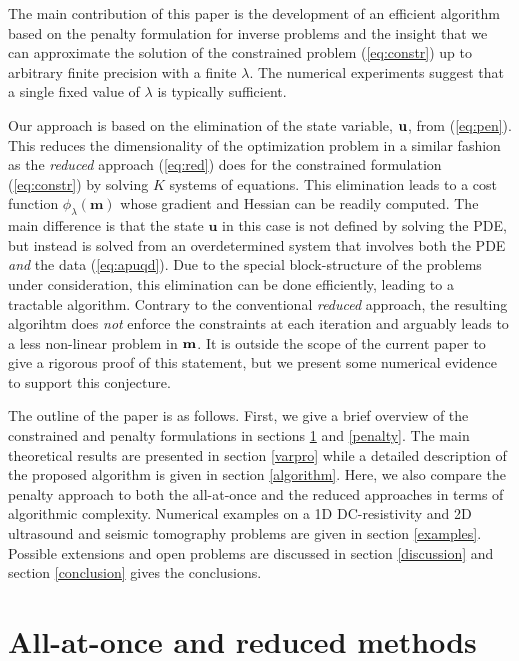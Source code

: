 \documentclass{iopart}
\begin{document}
The main contribution of this paper is the development of an efficient algorithm based on the penalty formulation for inverse problems and the insight that we can approximate the solution of the constrained problem (\ref{eq:constr}) up to arbitrary finite precision with a finite $\lambda$. The numerical experiments suggest that a single fixed value of $\lambda$ is typically sufficient.

Our approach is based on the elimination of the state variable, $\mathbf{u}$, from (\ref{eq:pen}). This reduces the dimensionality of the optimization problem in a similar fashion as the \emph{reduced} approach (\ref{eq:red}) does for the constrained formulation (\ref{eq:constr}) by solving $K$ systems of equations. This elimination leads to a cost function $\phi_{\lambda}(\mathbf{m})$ whose gradient and Hessian can be readily computed. The main difference is that the state $\mathbf{u}$ in this case is not defined by solving the PDE, but instead is solved from an overdetermined system that involves both the PDE \emph{and} the data (\ref{eq:apuqd}). Due to the special block-structure of the problems under consideration, this elimination can be done efficiently, leading to a tractable algorithm. Contrary to the conventional \emph{reduced} approach, the resulting algorihtm does \emph{not} enforce the constraints at each iteration and arguably leads to a less non-linear problem in $\mathbf{m}$. It is outside the scope of the current paper to give a rigorous proof of this statement, but we present some numerical evidence to support this conjecture.

The outline of the paper is as follows. First, we give a brief overview of the constrained and penalty formulations in sections \ref{lagrange} and \ref{penalty}. The main theoretical results are presented in section \ref{varpro} while a detailed description of the proposed algorithm is given in section \ref{algorithm}. Here, we also compare the penalty approach to both the all-at-once and the reduced approaches in terms of algorithmic complexity. Numerical examples on a 1D DC-resistivity and 2D ultrasound and seismic tomography problems are given in section \ref{examples}. Possible extensions and open problems are discussed in section \ref{discussion} and section \ref{conclusion} gives the conclusions.

\section{All-at-once and reduced methods}
\label{lagrange}
\end{document}
